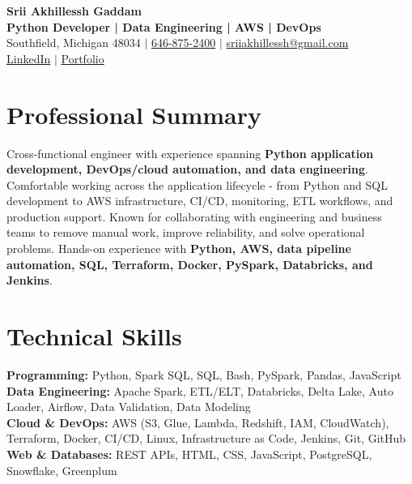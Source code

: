 \documentclass[letterpaper,10pt]{article}
\begin{document}
\fontsize{9.35pt}{10.45pt}\selectfont

\begin{center}
    {\LARGE \textbf{Srii Akhillessh Gaddam}} \\[-1pt]
    \textbf{Python Developer | Data Engineering | AWS | DevOps} \\[2pt]
    Southfield, Michigan 48034 $|$
    \href{tel:6468752400}{646-875-2400} $|$
    \href{mailto:sriiakhillessh@gmail.com}{sriiakhillessh@gmail.com} \\[1pt]
    \href{https://www.linkedin.com/in/srii-akhiilessh-gaddam-b48668191/}{LinkedIn} $|$
    \href{https://sriiakhillesshg.github.io/portfolio/}{Portfolio}
\end{center}
\vspace{-8pt}

\section{Professional Summary}
\small{Cross-functional engineer with experience spanning \textbf{Python application development, DevOps/cloud automation, and data engineering}. Comfortable working across the application lifecycle - from Python and SQL development to AWS infrastructure, CI/CD, monitoring, ETL workflows, and production support. Known for collaborating with engineering and business teams to remove manual work, improve reliability, and solve operational problems. Hands-on experience with \textbf{Python, AWS, data pipeline automation, SQL, Terraform, Docker, PySpark, Databricks, and Jenkins}.}

\section{Technical Skills}
\small{
\textbf{Programming:} Python, Spark SQL, SQL, Bash, PySpark, Pandas, JavaScript \\
\textbf{Data Engineering:} Apache Spark, ETL/ELT, Databricks, Delta Lake, Auto Loader, Airflow, Data Validation, Data Modeling \\
\textbf{Cloud \& DevOps:} AWS (S3, Glue, Lambda, Redshift, IAM, CloudWatch), Terraform, Docker, CI/CD, Linux, Infrastructure as Code, Jenkins, Git, GitHub \\
\textbf{Web \& Databases:} REST APIs, HTML, CSS, JavaScript, PostgreSQL, Snowflake, Greenplum
}
\end{document}
